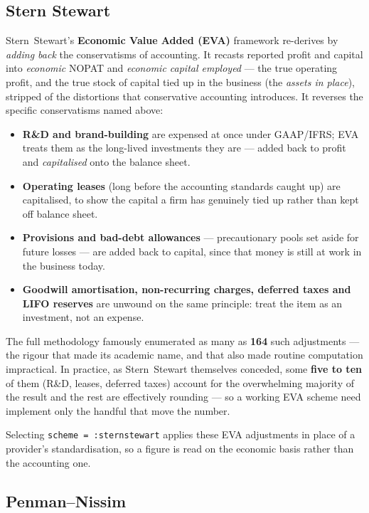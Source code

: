 \documentclass[11pt,a4paper]{report}
\begin{document}
\subsection{Stern Stewart}
\label{sec:schemes-sternstewart}
Stern~Stewart's \textbf{Economic Value Added (EVA)} framework re-derives by \emph{adding back} the
conservatisms of accounting. It recasts reported profit and capital into \emph{economic} NOPAT and
\emph{economic capital employed} --- the true operating profit, and the true stock of capital tied up in the
business (the \emph{assets in place}), stripped of the distortions that conservative accounting introduces. It
reverses the specific conservatisms named above:
\begin{itemize}
  \item \textbf{R\&D and brand-building} are expensed at once under GAAP/IFRS; EVA treats them as the
    long-lived investments they are --- added back to profit and \emph{capitalised} onto the balance sheet.
  \item \textbf{Operating leases} (long before the accounting standards caught up) are capitalised, to show
    the capital a firm has genuinely tied up rather than kept off balance sheet.
  \item \textbf{Provisions and bad-debt allowances} --- precautionary pools set aside for future losses ---
    are added back to capital, since that money is still at work in the business today.
  \item \textbf{Goodwill amortisation, non-recurring charges, deferred taxes and LIFO reserves} are unwound
    on the same principle: treat the item as an investment, not an expense.
\end{itemize}

The full methodology famously enumerated as many as \textbf{164} such adjustments --- the rigour that made
its academic name, and that also made routine computation impractical. In practice, as Stern~Stewart
themselves conceded, some \textbf{five to ten} of them (R\&D, leases, deferred taxes) account for the
overwhelming majority of the result and the rest are effectively rounding --- so a working EVA scheme need
implement only the handful that move the number.

Selecting \texttt{scheme = :sternstewart} applies these EVA adjustments in place of a provider's
standardisation, so a figure is read on the economic basis rather than the accounting one.

\subsection{Penman--Nissim}
\label{sec:schemes-penmannissim}
\end{document}
